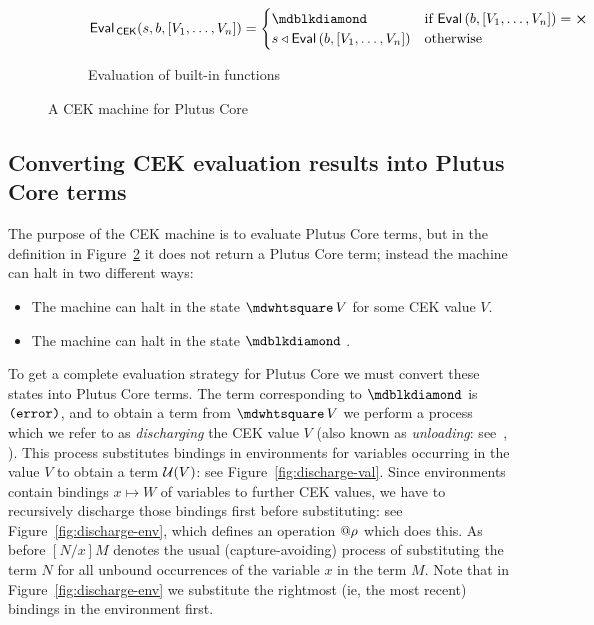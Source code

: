 \begin{figure}[H]
\bigskip
  \begin{subfigure}[c]{\linewidth}
$$ \EvalCEK(s, b, [V_1, \ldots, V_n]) =
   \begin{cases}
      \cekerror  & \text{if $\Eval\,(b,[V_1, \ldots, V_n]) = \errorX$}\\
      s \return \Eval\,(b,[V_1, \ldots, V_n]) & \text{otherwise}
   \end{cases}
$$
    \caption{Evaluation of built-in functions}
    \label{fig:untyped-cek-builtins}
    \end{subfigure}

  \caption{A CEK machine for Plutus Core}
\label{fig:untyped-cek-machine}
\end{figure}

\subsection{Converting CEK evaluation results into Plutus Core terms}
The purpose of the CEK machine is to evaluate Plutus Core terms, but in the
definition in Figure~\ref{fig:untyped-cek-machine} it does not return a Plutus
Core term; instead the machine can halt in two different ways:
\begin{itemize}
\item The machine can halt in the state $\cekhalt{V}$ for some CEK value $V$.
\item The machine can halt in the state $\cekerror{}$ .
\end{itemize}

\noindent To get a complete evaluation strategy for Plutus Core we must convert
these states into Plutus Core terms.  The term corresponding to $\cekerror{}$ is
$\texttt{(} \texttt{error} \texttt{)}$, and to obtain a term from $\cekhalt{V}$ we perform a process which we
refer to as \textit{discharging} the CEK value $V$ (also known as
\textit{unloading}: see~\cite[pp. 129--130]{Plotkin-cbn-cbv},
\cite[pp. 71ff]{Felleisen-pllc}).  This process substitutes bindings in
environments for variables occurring in the value $V$ to obtain a term
$\mathcal{U}(V)$: see Figure~\ref{fig:discharge-val}.  Since environments contain
bindings $x \mapsto W$ of variables to further CEK values, we have to
recursively discharge those bindings first before substituting: see
Figure~\ref{fig:discharge-env}, which defines an operation ${}@{\rho}$ which
does this.  As before $[N/x]M$ denotes the usual (capture-avoiding) process of
substituting the term $N$ for all unbound occurrences of the variable $x$ in the
term $M$. Note that in Figure~\ref{fig:discharge-env} we substitute the
rightmost (ie, the most recent) bindings in the environment first.

